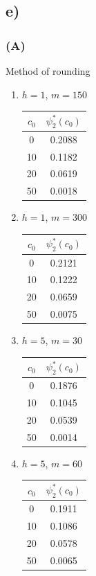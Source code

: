 \documentclass[titlepage]{article}
\begin{document}
	\subsection{e)}
	\subsubsection{(A)}
	Method of rounding
	\begin{enumerate}[]
		\item $h=1$, $m=150$\\
		\begin{tabular}{ |c|c|} 
			\hline
			$c_0$ & $\psi_2^*(c_0)$ \\ 
			\hline
			0 &  0.2088 \\ 
			10 & 0.1182 \\ 
			20 & 0.0619 \\ 
			50 & 0.0018 \\
			\hline
		\end{tabular}
	
		\item $h=1$, $m=300$\\
		\begin{tabular}{ |c|c|} 
			\hline
			$c_0$ & $\psi_2^*(c_0)$ \\ 
			\hline
			0 &  0.2121 \\ 
			10 & 0.1222 \\ 
			20 & 0.0659 \\ 
			50 & 0.0075 \\
			\hline
		\end{tabular}
	
		\item $h=5$, $m=30$\\
		\begin{tabular}{ |c|c|} 
			\hline
			$c_0$ & $\psi_2^*(c_0)$ \\ 
			\hline
			0 &  0.1876 \\ 
			10 & 0.1045 \\ 
			20 & 0.0539 \\ 
			50 & 0.0014 \\
			\hline
		\end{tabular}

		\item $h=5$, $m=60$\\
			\begin{tabular}{ |c|c|} 
				\hline
				$c_0$ & $\psi_2^*(c_0)$ \\ 
				\hline
				0 &  0.1911 \\ 
				10 & 0.1086 \\ 
				20 & 0.0578 \\ 
				50 & 0.0065 \\
				\hline
			\end{tabular}
	\end{enumerate}
\end{document}
